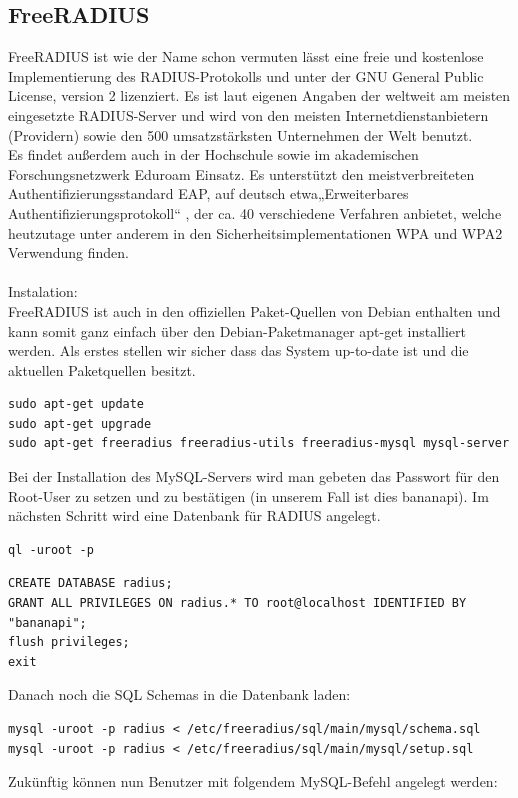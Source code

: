 \subsection{FreeRADIUS}
FreeRADIUS ist wie der Name schon vermuten lässt eine freie und kostenlose Implementierung des
RADIUS-Protokolls und unter der GNU General Public License, version 2 lizenziert. Es ist laut
eigenen Angaben der weltweit am meisten eingesetzte RADIUS-Server und wird von den meisten
Internetdienstanbietern (Providern) sowie den 500 umsatzstärksten Unternehmen der Welt
benutzt. \cite{rad2}\\
Es findet außerdem auch in der Hochschule sowie im akademischen Forschungsnetzwerk Eduroam
Einsatz. Es unterstützt den meistverbreiteten Authentifizierungsstandard EAP, auf deutsch etwa„Erweiterbares Authentifizierungsprotokoll“ \cite{rad3}
, der ca. 40 verschiedene Verfahren anbietet, welche
heutzutage unter anderem in den Sicherheitsimplementationen WPA und WPA2 Verwendung
finden.\\
~\\
Instalation:\\
FreeRADIUS ist auch in den offiziellen Paket-Quellen von Debian enthalten und kann somit ganz
einfach über den Debian-Paketmanager apt-get installiert werden. Als erstes stellen wir sicher dass
das System up-to-date ist und die aktuellen Paketquellen besitzt. \cite{rad4}
\begin{lstlisting}
sudo apt-get update
sudo apt-get upgrade
sudo apt-get freeradius freeradius-utils freeradius-mysql mysql-server
\end{lstlisting}
Bei der Installation des MySQL-Servers wird man gebeten das Passwort für den Root-User zu
setzen und zu bestätigen (in unserem Fall ist dies bananapi). Im nächsten Schritt wird eine
Datenbank für RADIUS angelegt.
\begin{lstlisting}
ql -uroot -p
\end{lstlisting}
\begin{lstlisting}
CREATE DATABASE radius;
GRANT ALL PRIVILEGES ON radius.* TO root@localhost IDENTIFIED BY "bananapi";
flush privileges;
exit
\end{lstlisting}
Danach noch die SQL Schemas in die Datenbank laden: \cite{rad5}
\begin{lstlisting}
mysql -uroot -p radius < /etc/freeradius/sql/main/mysql/schema.sql
mysql -uroot -p radius < /etc/freeradius/sql/main/mysql/setup.sql
\end{lstlisting}
Zukünftig können nun Benutzer mit folgendem MySQL-Befehl angelegt werden:
